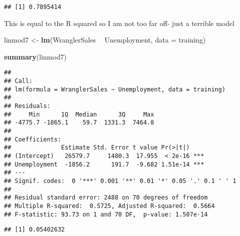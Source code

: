 \documentclass[]{article}
\newenvironment{Shaded}{\begin{snugshade}}{\end{snugshade}}
\newcommand{\KeywordTok}[1]{\textcolor[rgb]{0.13,0.29,0.53}{\textbf{#1}}}
\newcommand{\DataTypeTok}[1]{\textcolor[rgb]{0.13,0.29,0.53}{#1}}
\newcommand{\DecValTok}[1]{\textcolor[rgb]{0.00,0.00,0.81}{#1}}
\newcommand{\StringTok}[1]{\textcolor[rgb]{0.31,0.60,0.02}{#1}}
\newcommand{\CommentTok}[1]{\textcolor[rgb]{0.56,0.35,0.01}{\textit{#1}}}
\newcommand{\OperatorTok}[1]{\textcolor[rgb]{0.81,0.36,0.00}{\textbf{#1}}}
\newcommand{\NormalTok}[1]{#1}
\begin{document}
\begin{verbatim}
## [1] 0.7895414
\end{verbatim}

This is equal to the R squared so I am not too far off- just a terrible
model

\begin{Shaded}
\begin{Highlighting}[]
\NormalTok{linmod7 <-}\StringTok{ }\KeywordTok{lm}\NormalTok{(WranglerSales }\OperatorTok{~}\StringTok{ }\NormalTok{Unemployment, }\DataTypeTok{data =}\NormalTok{ training)}

\KeywordTok{summary}\NormalTok{(linmod7)}
\end{Highlighting}
\end{Shaded}

\begin{verbatim}
## 
## Call:
## lm(formula = WranglerSales ~ Unemployment, data = training)
## 
## Residuals:
##     Min      1Q  Median      3Q     Max 
## -4775.7 -1865.1    59.7  1331.3  7464.8 
## 
## Coefficients:
##              Estimate Std. Error t value Pr(>|t|)    
## (Intercept)   26579.7     1480.3  17.955  < 2e-16 ***
## Unemployment  -1856.2      191.7  -9.682 1.51e-14 ***
## ---
## Signif. codes:  0 '***' 0.001 '**' 0.01 '*' 0.05 '.' 0.1 ' ' 1
## 
## Residual standard error: 2488 on 70 degrees of freedom
## Multiple R-squared:  0.5725, Adjusted R-squared:  0.5664 
## F-statistic: 93.73 on 1 and 70 DF,  p-value: 1.507e-14
\end{verbatim}

\begin{Shaded}
\end{Shaded}

\begin{verbatim}
## [1] 0.05402632
\end{verbatim}
\end{document}
